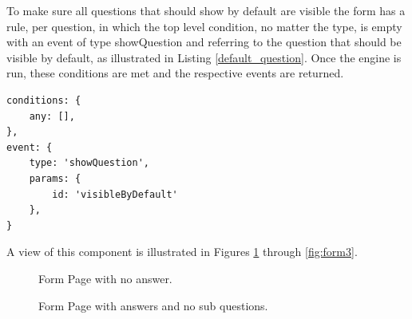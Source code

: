 To make sure all questions that should show by default are visible the form has a rule, per question, in which the top level condition, no matter the type, is empty with an event of type showQuestion and referring to the question that should be visible by default, as illustrated in Listing \ref{default_question}.
Once the engine is run, these conditions are met and the respective events are returned.

\begin{lstlisting}[style=sharpc, caption={Condition for visible by default questions}, label={default_question}]
conditions: {
	any: [],
},
event: {
	type: 'showQuestion',
	params: {
		id: 'visibleByDefault'
	},
}
\end{lstlisting}

A view of this component is illustrated in Figures \ref{fig:form1} through \ref{fig:form3}.

\begin{figure}[h]
	\begin{center}
	\end{center}
	\caption{Form Page with no answer.}\label{fig:form1}
\end{figure}

\begin{figure}[h]
	\begin{center}
	\end{center}
	\caption{Form Page with answers and no sub questions.}\label{fig:form2}
\end{figure}

